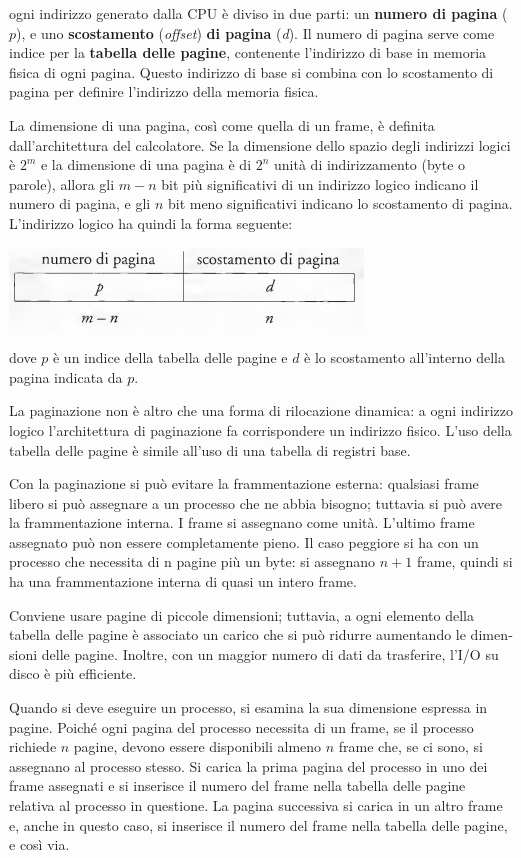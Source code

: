 \documentclass[11pt,a4paper]{article}
\begin{document}
ogni indirizzo ge­nerato dalla CPU è diviso in due parti: un \textbf{numero di pagina} ($p$), e uno \textbf{scostamento} (\emph{offset})
\textbf{di pagina} (\emph{d}). Il numero di pagina serve come indice per la \textbf{tabella delle pagine}, contenen­te l'indirizzo di base in memoria fisica di ogni pagina. Questo indirizzo di base si combina con lo scostamento di pagina per definire l'indirizzo della memoria fisica.

La dimensione di una pagina, così come quella di un frame, è definita dall'architettura del
calcolatore. Se la dimensione
dello spazio degli indirizzi logici è $2^m$ e la dimensione di una pagina è di $2^n$ unità di indirizzamento (byte o parole), allora gli $m - n$ bit più significativi di un indirizzo logico indicano
il numero di pagina, e gli $n$ bit meno significativi indicano lo scostamento di pagina. L'indi­rizzo logico ha quindi la forma seguente:
\begin{center}
  \includegraphics[scale=0.6]{img/0038.png}
\end{center}
dove $p$ è un indice della tabella delle pagine e $d$ è lo scostamento all'interno della pagina in­dicata da $p$.

La paginazione non è altro che una forma di rilocazione
dinamica: a ogni indirizzo logico l'architettura di paginazione fa corrispondere un indirizzo
fisico. L'uso della tabella delle pagine è simile all'uso di una tabella di registri base.

Con la paginazione si può evitare la frammentazione esterna: qualsiasi frame libero si
può assegnare a un processo che ne abbia bisogno; tuttavia si può avere la frammentazione
interna. I frame si assegnano come unità. L'ultimo frame assegnato
può non essere completamente pieno. Il caso peggiore si ha con un
processo che necessita di n pagine più un byte: si assegnano $n + 1$ frame, quindi si ha una
frammentazione interna di quasi un intero frame.

Conviene usare pagine di piccole dimensioni; tuttavia, a ogni elemen­to della tabella delle pagine è associato un carico che si può ridurre aumentando le dimen­sioni delle pagine. Inoltre, con un maggior numero di dati da trasferire, l'I/O su disco è più
efficiente.

Quando si deve eseguire un processo, si esamina la sua dimensione espressa in pagine.
Poiché ogni pagina del processo necessita di un frame, se il processo richiede $n$ pagine, de­vono essere disponibili almeno $n$ frame che, se ci sono, si assegnano al processo stesso. Si ca­rica la prima pagina del processo in uno dei frame assegnati e si inserisce il numero del frame
nella tabella delle pagine relativa al processo in questione. La pagina successiva si carica in
un altro frame e, anche in questo caso, si inserisce il numero del frame nella tabella delle pa­gine, e così via.
\end{document}
